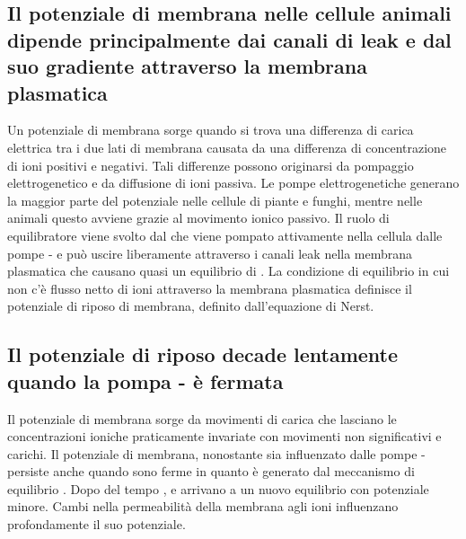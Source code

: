 \subsection{Il potenziale di membrana nelle cellule animali dipende principalmente dai canali di leak  e dal suo gradiente attraverso la membrana plasmatica}
Un potenziale di membrana sorge quando si trova una differenza di carica elettrica tra i due lati di membrana causata da una differenza di concentrazione di ioni positivi e negativi. 
Tali differenze possono originarsi da pompaggio elettrogenetico e da diffusione di ioni passiva. Le pompe elettrogenetiche generano la maggior parte del potenziale nelle cellule di 
piante e funghi, mentre nelle animali questo avviene grazie al movimento ionico passivo. Il ruolo di equilibratore viene svolto dal  che viene pompato attivamente nella cellula 
dalle pompe - e pu\`o uscire liberamente attraverso i canali  leak nella membrana plasmatica che causano quasi un equilibrio di . La condizione di equilibrio
in cui non c'\`e flusso netto di ioni attraverso la membrana plasmatica definisce il potenziale di riposo di membrana, definito dall'equazione di Nerst.
\subsection{Il potenziale di riposo decade lentamente quando la pompa - \`e fermata}
Il potenziale di membrana sorge da movimenti di carica che lasciano le concentrazioni ioniche praticamente invariate con movimenti non significativi e carichi. Il potenziale di membrana,
nonostante sia influenzato dalle pompe - persiste anche quando sono ferme in quanto \`e generato dal meccanismo di equilibrio . Dopo del tempo 
,  e  arrivano a un nuovo equilibrio con potenziale minore. Cambi nella permeabilit\`a della membrana agli ioni influenzano profondamente il suo potenziale.
